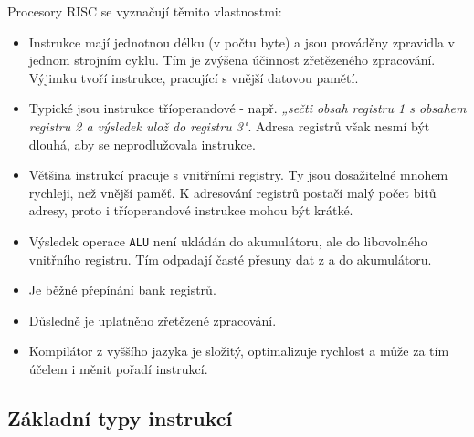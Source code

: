       Procesory RISC se vyznačují těmito vlastnostmi:
      \begin{itemize}\addtolength{\itemsep}{-0.5\baselineskip}
        \item Instrukce mají jednotnou délku (v počtu byte) a jsou prováděny zpravidla v jednom   
              strojním cyklu. Tím je zvýšena účinnost zřetězeného zpracování. Výjimku tvoří 
              instrukce, pracující s vnější datovou pamětí.        
        \item Typické jsou instrukce tříoperandové - např. \emph{„sečti obsah registru 1 s obsahem  
              registru 2 a výsledek ulož do registru 3"}. Adresa registrů však nesmí být dlouhá, 
              aby se neprodlužovala instrukce.
        \item Většina instrukcí pracuje s vnitřními registry. Ty jsou dosažitelné mnohem rychleji,  
              než vnější paměť. K adresování registrů postačí malý počet bitů adresy, proto i 
              tříoperandové instrukce mohou být krátké.        
        \item Výsledek operace \texttt{ALU} není ukládán do akumulátoru, ale do libovolného    
              vnitřního registru. Tím odpadají časté přesuny dat z a do akumulátoru.
        \item Je běžné přepínání bank registrů.        
        \item Důsledně je uplatněno zřetězené zpracování.        
        \item Kompilátor z vyššího jazyka je složitý, optimalizuje rychlost a může za tím účelem i  
              měnit pořadí instrukcí.       
      \end{itemize}
    
    \subsection{Základní typy instrukcí}\label{ces:IchapIVsecIIssecV}
